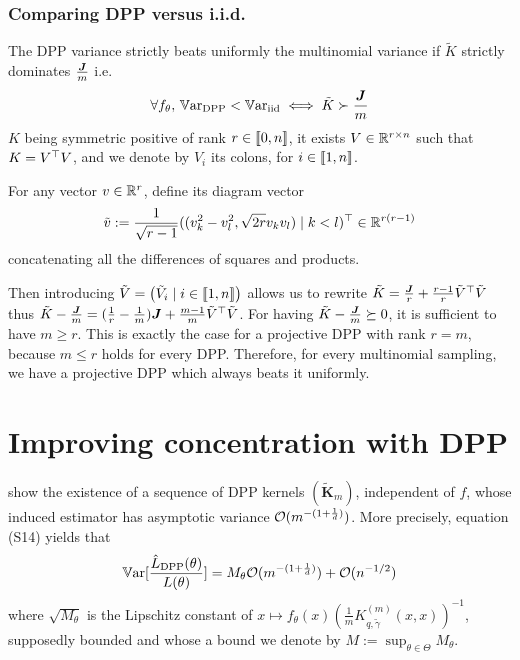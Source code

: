 \subsubsection{Comparing DPP versus i.i.d.}
The DPP variance strictly beats uniformly the multinomial variance if $\tilde K$ strictly dominates $\frac{\boldsymbol{J}}{m}$ i.e. 
\begin{equation}
	\forall f_\theta, \, \operatorname{\mathbb V ar}_{\textrm{DPP}} < \operatorname{\mathbb V ar}_{\textrm{iid}} \iff \tilde K \succ \frac{\boldsymbol{J}}{m}
\end{equation}
$K$ being symmetric positive of rank $r \in \llbracket 0,n \rrbracket$, it exists $V \in \mathbb{R}^{r \times n}$ such that $K = V^\top V$, and we denote by $V_i$ its colons, for $i \in \llbracket 1,n \rrbracket$.

For any vector $v \in \mathbb{R}^{r}$, \cite{copenhaver2013diagramvectors} define its diagram vector 
$$\tilde v :=
 \frac{1}{\sqrt{r-1}} ((v_k^{2}-v_l^{2} , \sqrt{2 r} v_k v_l ) \mid k<l)^\top \in \mathbb{R}^{r(r-1)}$$
concatenating all the differences of squares and products.

Then introducing $\tilde V = \begin{pmatrix}\tilde V_i \mid i\in\llbracket 1,n \rrbracket\end{pmatrix}
$ allows us to rewrite $\tilde K = \frac{\boldsymbol{J}}{r} + \frac{r-1}{r} \tilde V^\top \tilde V$ thus $\tilde K - \frac{\boldsymbol{J}}{m} = (\frac{1}{r}-\frac{1}{m})\boldsymbol{J} + \frac{m-1}{m} \tilde V^\top \tilde V$. For having $\tilde K - \frac{\boldsymbol{J}}{m}\succeq 0$, it is sufficient to have $m \geq r$. This is exactly the case for a projective DPP with rank $r = m$, because $m \leq r$ holds for every DPP. Therefore, for every multinomial sampling, we have a projective DPP which always beats it uniformly.





\section{Improving concentration with DPP}

\cite{bardenet2021sgddpp} show the existence of a sequence of DPP kernels $(\tilde{\boldsymbol K}_m)$, independent of $f$, whose induced estimator has asymptotic variance $\mathcal{O}( m ^{-(1+\frac 1 d)})$. More precisely, 	
equation (S14) yields that 
\begin{equation}
	\operatorname{\mathbb V ar}[\frac{\hat L_{\textrm{DPP}}(\theta)}{L(\theta)}] = M_\theta \mathcal{O}( m ^{-(1+\frac 1 d)}) +\mathcal{O}( n^{-1/2})
\end{equation}
where $\sqrt{M_\theta}$ is the Lipschitz constant of $x \mapsto f_\theta(x) (\frac{1}{m} K^{(m)}_{q, \tilde \gamma}(x,x))^{-1}$, supposedly bounded and whose a bound we denote by $M := \sup_{\theta \in \Theta}M_\theta$.

